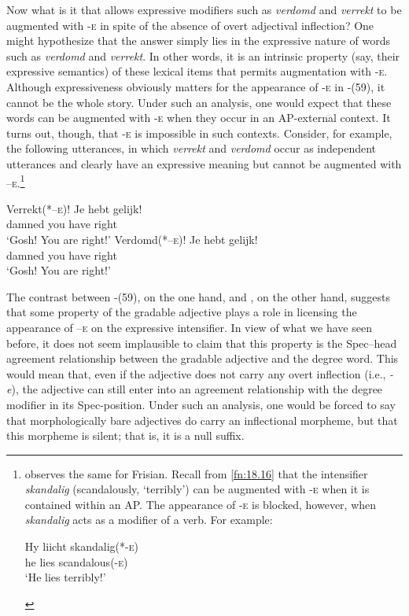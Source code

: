 \documentclass[output=paper]{langsci/langscibook}
\begin{document}
Now what is it that allows expressive modifiers such as \emph{verdomd} and
\emph{verrekt} to be augmented with \textsc{-e}  in spite of the absence of
overt adjectival inflection? One might hypothesize that the answer simply lies
in the expressive nature of words such as \emph{verdomd} and \emph{verrekt}. In
other words, it is an intrinsic property (say, their expressive semantics) of
these lexical items that permits augmentation with \textsc{-e}. Although
expressiveness obviously matters for the appearance of \textsc{-e} in
-(59), it cannot be the whole story. Under such an analysis, one
would expect that these words can be augmented with \textsc{-e} when they occur
in an AP-external context. It turns out, though,  that \textsc{-e} is
impossible in such contexts. Consider, for example, the following utterances,
in which \emph{verrekt} and \emph{verdomd} occur as independent utterances and
clearly have an expressive meaning but cannot be augmented with
\textsc{–e.}\footnote{\citet{Verdenius1939} observes the same for Frisian.
    Recall from \cref{fn:18.16} that the intensifier \emph{skandalig}
    (scandalously, \enquote*{terribly}) can be augmented with \textsc{-e} when
    it is contained within an AP. The appearance of \textsc{-e} is blocked,
    however, when \emph{skandalig} acts as a modifier of a verb. For example:

\begin{exe}
    \sn
    \gll Hy liicht skandalig(*\textsc{-e})\\
    	 he lies scandalous(\textsc{-e})\\
    \glt \enquote*{He lies terribly!}
\end{exe}}

\ea%
    \label{ex:key:18.60}
	\ea
	\gll Verrekt(*\textsc{–e})!  Je      hebt    gelijk!\\
		damned            you  have  right\\
	\glt ‘Gosh! You are right!’
	\ex
	\gll Verdomd(*\textsc{–e})!  Je      hebt    gelijk!\\
		damned                you  have  right\\
	\glt ‘Gosh! You are right!’
	\z
\z

The contrast between -(59), on the one hand, and
, on the other hand, suggests that some property of the gradable
adjective plays a role in licensing the appearance of  \textsc{–e} on the
expressive intensifier. In view of what we have seen before, it does not seem
implausible to claim that this property is the Spec--head agreement relationship
between the gradable adjective and the degree word. This would mean that, even
if the adjective does not carry any overt inflection (i.e., \emph{-e}), the
adjective can still enter into an agreement relationship with the degree
modifier in its Spec-position. Under such an analysis, one would be forced to
say that morphologically bare adjectives do carry an inflectional morpheme, but
that this morpheme is silent; that is, it is a null suffix.
\end{document}
